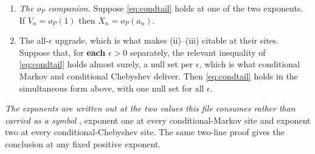 \begin{lemma}
\begin{enumerate}
\item[(iii)] \emph{The $o_P$ companion.} Suppose \eqref{eq:condtail} holds at one of the two exponents. If
$V_n=o_P(1)$ then $X_n=o_P(a_n)$.
\item[(iv)] The all-$\epsilon$ upgrade, which is what makes (ii)--(iii) citable at their sites.
Suppose that, for \textbf{each} $\epsilon>0$ separately, the relevant inequality of
\eqref{eq:condtail} holds almost surely, a null set per $\epsilon$, which is what conditional Markov and
conditional Chebyshev deliver. Then \eqref{eq:condtail} holds in the simultaneous form above, with one
null set for all $\epsilon$.
\end{enumerate}
\emph{The exponents are written out at the two values this file consumes rather than carried as a symbol}
, exponent one at every conditional-Markov site and exponent two at every conditional-Chebyshev site.
The same two-line proof gives the conclusion at any fixed positive exponent.
\end{lemma}

